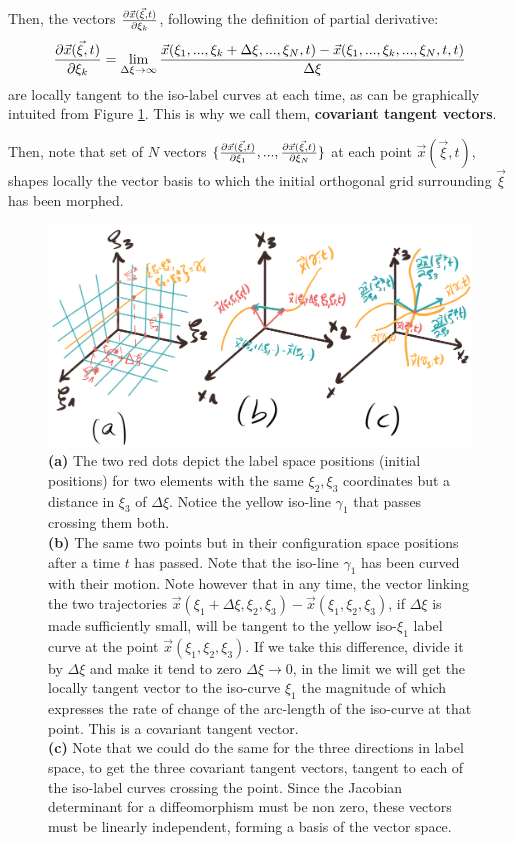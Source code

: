 \documentclass[11pt, a4paper]{article} %
\begin{document}
 Then, the vectors $\pdv{\vec{x}(\vec{\xi},t)}{\xi_k}$, following the definition of partial derivative:
\begin{equation}
\pdv{\vec{x}(\vec{\xi},t)}{\xi_k}=\lim_{\Delta \xi \rightarrow \infty} \frac{\vec{x}(\xi_1,...,\xi_k+\Delta \xi,...,\xi_N,t)-\vec{x}(\xi_1,...,\xi_k,...,\xi_N,t,t)}{\Delta \xi}
\end{equation}
are locally tangent to the iso-label curves at each time, as can be graphically intuited from Figure \ref{fig:covariant}. This is why we call them, {\bf covariant tangent vectors}. 

Then, note that set of $N$ vectors $\{\pdv{\vec{x}(\vec{\xi},t)}{\xi_1},...,\pdv{\vec{x}(\vec{\xi},t)}{\xi_N} \}$ at each point $\vec{x}(\vec{\xi},t)$, shapes locally the vector basis to which the initial orthogonal grid surrounding $\vec{\xi}$ has been morphed.
\begin{figure}[h!]
  \centering
    \includegraphics[width=0.75\linewidth]{3covariant_tangent_vectors.png}
  \caption{{\bf (a)} The two red dots depict the label space positions (initial positions) for two elements with the same $\xi_2, \xi_3$ coordinates but a distance in $\xi_3$ of $\Delta \xi$. Notice the yellow iso-line $\gamma_1$ that passes crossing them both.\\ {\bf (b)} The same two points but in their configuration space positions after a time $t$ has passed. Note that the iso-line $\gamma_1$ has been curved with their motion. Note however that in any time, the vector linking the two trajectories $\vec{x}(\xi_1+\Delta\xi,\xi_2,\xi_3)-\vec{x}(\xi_1,\xi_2,\xi_3)$, if $\Delta \xi$ is made sufficiently small, will be tangent to the yellow iso-$\xi_1$ label curve at the point $\vec{x}(\xi_1,\xi_2,\xi_3)$. If we take this difference, divide it by $\Delta \xi$ and make it tend to zero $\Delta \xi\rightarrow 0$, in the limit we will get the locally tangent vector to the iso-curve $\xi_1$ the magnitude of which expresses the rate of change of the arc-length of the iso-curve at that point. This is a covariant tangent vector.\\ {\bf (c)} Note that we could do the same for the three directions in label space, to get the three covariant tangent vectors, tangent to each of the iso-label curves crossing the point. Since the Jacobian determinant for a diffeomorphism must be non zero, these vectors must be linearly independent, forming a basis of the vector space. }
  \label{fig:covariant}
\end{figure}
\end{document}
